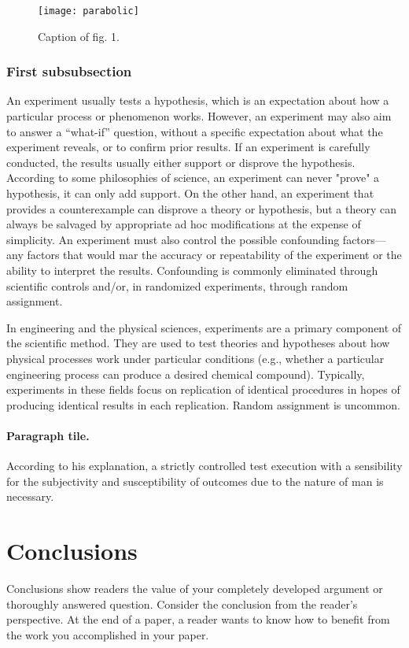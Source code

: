 \documentclass[11pt, a4paper]{article}
\begin{document}
\begin{figure}
	\centering
	\texttt{[image: parabolic]}
	\caption{Caption of fig. 1.}
	\label{fig:parabolic}
\end{figure}

\subsubsection{First subsubsection}
An experiment usually tests a hypothesis, which is an expectation about how a particular process or phenomenon works. However, an experiment may also aim to answer a ``what-if'' question, without a specific expectation about what the experiment reveals, or to confirm prior results. If an experiment is carefully conducted, the results usually either support or disprove the hypothesis. According to some philosophies of science, an experiment can never "prove" a hypothesis, it can only add support. On the other hand, an experiment that provides a counterexample can disprove a theory or hypothesis, but a theory can always be salvaged by appropriate ad hoc modifications at the expense of simplicity. An experiment must also control the possible confounding factors—any factors that would mar the accuracy or repeatability of the experiment or the ability to interpret the results. Confounding is commonly eliminated through scientific controls and/or, in randomized experiments, through random assignment.

In engineering and the physical sciences, experiments are a primary component of the scientific method. They are used to test theories and hypotheses about how physical processes work under particular conditions (e.g., whether a particular engineering process can produce a desired chemical compound). Typically, experiments in these fields focus on replication of identical procedures in hopes of producing identical results in each replication. Random assignment is uncommon.

\paragraph{Paragraph tile.}
According to his explanation, a strictly controlled test execution with a sensibility for the subjectivity and susceptibility of outcomes due to the nature of man is necessary.

\section{Conclusions}\label{sec:conc} 
Conclusions show readers the value of your completely developed argument or thoroughly answered question. Consider the conclusion from the reader's perspective. At the end of a paper, a reader wants to know how to benefit from the work you accomplished in your paper. 
\end{document}
